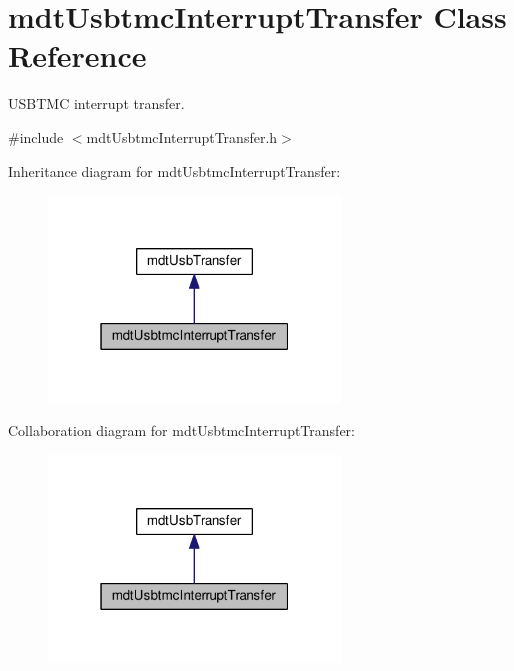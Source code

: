 \hypertarget{classmdt_usbtmc_interrupt_transfer}{\section{mdt\-Usbtmc\-Interrupt\-Transfer Class Reference}
\label{classmdt_usbtmc_interrupt_transfer}
}


U\-S\-B\-T\-M\-C interrupt transfer.  




{\ttfamily \#include $<$mdt\-Usbtmc\-Interrupt\-Transfer.\-h$>$}



Inheritance diagram for mdt\-Usbtmc\-Interrupt\-Transfer\-:\nopagebreak
\begin{figure}[H]
\begin{center}
\leavevmode
\includegraphics[width=220pt]{classmdt_usbtmc_interrupt_transfer__inherit__graph}
\end{center}
\end{figure}


Collaboration diagram for mdt\-Usbtmc\-Interrupt\-Transfer\-:\nopagebreak
\begin{figure}[H]
\begin{center}
\leavevmode
\includegraphics[width=220pt]{classmdt_usbtmc_interrupt_transfer__coll__graph}
\end{center}
\end{figure}
